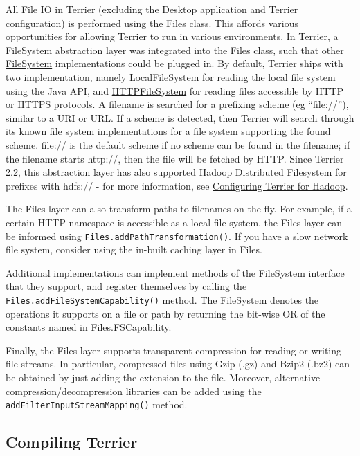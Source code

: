All File IO in Terrier (excluding the Desktop application and Terrier
configuration) is performed using the
\href{javadoc/org/terrier/utility/Files.html}{Files} class. This affords
various opportunities for allowing Terrier to run in various
environments. In Terrier, a FileSystem abstraction layer was integrated
into the Files class, such that other
\href{javadoc/org/terrier/utility/io/FileSystem.html}{FileSystem}
implementations could be plugged in. By default, Terrier ships with two
implementation, namely
\href{javadoc/org/terrier/utility/io/LocalFileSystem.html}{LocalFileSystem}
for reading the local file system using the Java API, and
\href{javadoc/org/terrier/utility/io/HTTPFileSystem.html}{HTTPFileSystem}
for reading files accessible by HTTP or HTTPS protocols. A filename is
searched for a prefixing scheme (eg ``file://''), similar to a URI or
URL. If a scheme is detected, then Terrier will search through its known
file system implementations for a file system supporting the found
scheme. file:// is the default scheme if no scheme can be found in the
filename; if the filename starts http://, then the file will be fetched
by HTTP. Since Terrier 2.2, this abstraction layer has also supported
Hadoop Distributed Filesystem for prefixes with hdfs:// - for more
information, see \href{hadoop_configuration.html}{Configuring Terrier
for Hadoop}.

The Files layer can also transform paths to filenames on the fly. For
example, if a certain HTTP namespace is accessible as a local file
system, the Files layer can be informed using
\texttt{Files.addPathTransformation()}. If you have a slow network file
system, consider using the in-built caching layer in Files.

Additional implementations can implement methods of the FileSystem
interface that they support, and register themselves by calling the
\texttt{Files.addFileSystemCapability()} method. The FileSystem denotes
the operations it supports on a file or path by returning the bit-wise
OR of the constants named in Files.FSCapability.

Finally, the Files layer supports transparent compression for reading or
writing file streams. In particular, compressed files using Gzip (.gz)
and Bzip2 (.bz2) can be obtained by just adding the extension to the
file. Moreover, alternative compression/decompression libraries can be
added using the \texttt{addFilterInputStreamMapping()} method.

\href{}{}

\subsection{Compiling Terrier}\label{compiling-terrier}

